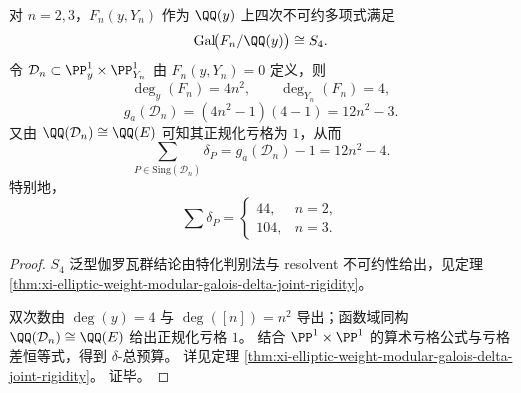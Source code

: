 \begin{theorem}[泛型伽罗瓦群与对应曲线奇点预算的联合刚性]\label{thm:xi-elliptic-weight-modular-galois-delta-joint-rigidity}
对 \(n=2,3\)，\(F_n(y,Y_n)\) 作为 \(\QQ(y)\) 上四次不可约多项式满足
\[
\mathrm{Gal}\!\bigl(F_n/\QQ(y)\bigr)\cong S_4.
\]
令 \(\mathcal D_n\subset \PP^1_y\times\PP^1_{Y_n}\) 由 \(F_n(y,Y_n)=0\) 定义，则
\[
\deg_y(F_n)=4n^2,\qquad \deg_{Y_n}(F_n)=4,
\]
\[
g_a(\mathcal D_n)=(4n^2-1)(4-1)=12n^2-3.
\]
又由 \(\QQ(\mathcal D_n)\cong \QQ(E)\) 可知其正规化亏格为 \(1\)，从而
\[
\sum_{P\in\mathrm{Sing}(\mathcal D_n)}\delta_P
=g_a(\mathcal D_n)-1
=12n^2-4.
\]
特别地，
\[
\sum\delta_P=
\begin{cases}
44,& n=2,\\
104,& n=3.
\end{cases}
\]
\end{theorem}
\begin{proof}
\(S_4\) 泛型伽罗瓦群结论由特化判别法与 resolvent 不可约性给出，见定理
\ref{thm:xi-elliptic-weight-modular-galois-delta-joint-rigidity}。
\par
双次数由 \(\deg(y)=4\) 与 \(\deg([n])=n^2\) 导出；函数域同构
\(
\QQ(\mathcal D_n)\cong \QQ(E)
\)
给出正规化亏格 \(1\)。
结合 \(\PP^1\times\PP^1\) 的算术亏格公式与亏格差恒等式，得到 \(\delta\)-总预算。
详见定理
\ref{thm:xi-elliptic-weight-modular-galois-delta-joint-rigidity}。
证毕。
\end{proof}

\endinput
